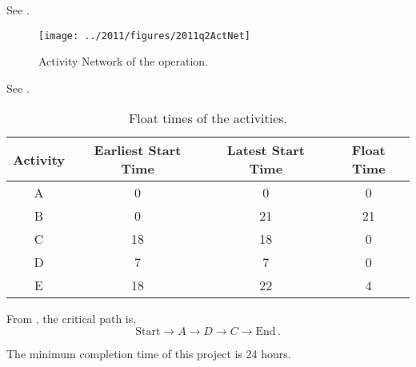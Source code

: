 \begin{subquestions}
\subquestion

\begin{subsubquestions}
	
\subsubquestion

See .

\begin{figure}
	\begin{center}
		\texttt{[image: ../2011/figures/2011q2ActNet]}
		\caption{\label{2011:q2:fig:ActNet} Activity Network of the operation.}
	\end{center}
\end{figure}


\subsubquestion

See .

\begin{table}[ht]
	\centering
	\begin{tabular}{|c|c|c|c|}
		\hline
		Activity & Earliest Start Time & Latest Start Time & Float Time \\
		\hline
		A & 0 & 0 & 0 \\
		B & 0 & 21 & 21 \\
		C & 18 & 18 & 0 \\
		D & 7 & 7 & 0 \\
		E & 18 & 22 & 4 \\
		\hline
	\end{tabular}
	\caption{\label{2011:q2:tab:Table1} Float times of the activities.}
\end{table}
	

\subsubquestion

\begin{subsubsubquestions}
	
\subsubsubquestion

From , the critical path is,
\begin{equation}
	\text{Start} \rightarrow A \rightarrow D \rightarrow C \rightarrow \text{End}\,.
\end{equation}


\subsubsubquestion

The minimum completion time of this project is 24 hours.

\end{subsubsubquestions}

\end{subsubquestions}

\end{subquestions}


